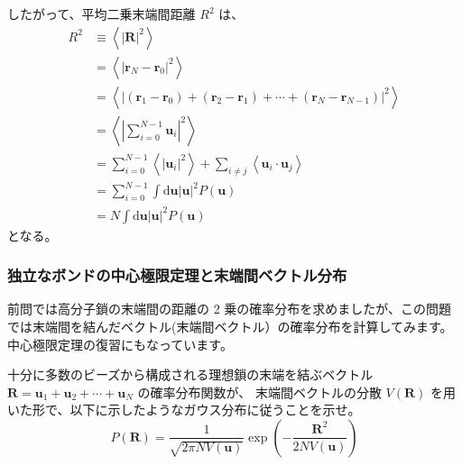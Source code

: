 \documentclass[uplatex,dvipdfmx,a4paper,11pt]{jsarticle}
\newcommand{\diff}{\mathrm d}
\begin{document}
\begin{enumerate}
したがって、平均二乗末端間距離 $R^2$ は、
\begin{align*}
R^2 
	&\equiv \left \langle \left | \bm{R} \right |^2 \right \rangle \\
	&
	= \left \langle \left | \bm{r}_N - \bm{r}_0 \right |^2 \right \rangle \\
	&= \left \langle \left | (\bm{r}_1 - \bm{r}_0) + (\bm{r}_2 - \bm{r}_1) + \cdots + (\bm{r}_N - \bm{r}_{N-1}) \right |^2 \right \rangle \\
	&= \left \langle \left| \sum_{i=0}^{N-1} \bm{u}_{i} \right|^2 \right\rangle \\
	&= \sum_{i=0}^{N-1} \left \langle \left| \bm{u}_{i} \right|^2 \right\rangle + \sum_{i \neq j} \left \langle \bm{u}_{i} \cdot \bm{u}_{j} \right\rangle \\
	&= \sum_{i=0}^{N-1} \int \diff \bm{u}  \vert \bm{u} \vert^2 P(\bm{u}) \\
	&= N \int \diff \bm{u}  \vert \bm{u} \vert^2 P(\bm{u})
\end{align*}
となる。


\end{enumerate}

\newpage



\subsubsection{独立なボンドの中心極限定理と末端間ベクトル分布}

\begin{boxnote}
前問では高分子鎖の末端間の距離の 2 乗の確率分布を求めましたが、この問題では末端間を結んだベクトル(末端間ベクトル）の確率分布を計算してみます。
中心極限定理の復習にもなっています。
\end{boxnote}
\vspace{8pt}

十分に多数のビーズから構成される理想鎖の末端を結ぶベクトル $\bm{R} = \bm{u}_1 + \bm{u}_2 + \cdots + \bm{u}_N$ の確率分布関数が、
末端間ベクトルの分散 $V(\bm{R})$ を用いた形で、以下に示したようなガウス分布に従うことを示せ。
\begin{equation*}
P(\bm{R}) = \dfrac{1}{\sqrt{2 \pi N V(\bm{u})}} \exp \left(-\dfrac{\bm{R}^2}{2 N V(\bm{u})} \right)
\end{equation*}
\end{document}
